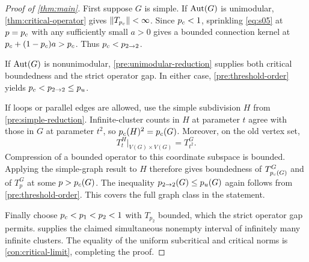 \begin{proof}[Proof of \cref{thm:main}]
First suppose $G$ is simple. If $\operatorname{Aut}(G)$ is unimodular,
\cref{thm:critical-operator} gives $\lVert T_{{p_c}}\rVert<\infty$.
Since ${p_c}<1$, sprinkling \eqref{eq:s05} at $p={p_c}$ with any
sufficiently small $a>0$ gives a bounded connection kernel at
${p_c}+(1-{p_c})a>{p_c}$. Thus ${p_c}<{p_{2\to2}}$.

If $\operatorname{Aut}(G)$ is nonunimodular, \cref{pre:unimodular-reduction} supplies both
critical boundedness and the strict operator gap. In either case,
\cref{pre:threshold-order} yields ${p_c}<{p_{2\to2}}\le{p_u}$.

If loops or parallel edges are allowed, use the simple subdivision
$H$ from \cref{pre:simple-reduction}. Infinite-cluster counts in $H$
at parameter $t$ agree with those in $G$ at parameter $t^2$, so
${p_c}(H)^2={p_c}(G)$. Moreover, on the old vertex set,
\[
 T^H_t\big|_{V(G)\times V(G)}=T^G_{t^2}.
\]
Compression of a bounded operator to this coordinate subspace is
bounded. Applying the simple-graph result to $H$ therefore gives
boundedness of $T^G_{{p_c}(G)}$ and of $T^G_p$ at some $p>{p_c}(G)$.
The inequality ${p_{2\to2}}(G)\le{p_u}(G)$ again follows from
\cref{pre:threshold-order}. This covers the full graph class in the
statement.

Finally choose ${p_c}<p_1<p_2<1$ with $T_{p_2}$ bounded, which the strict
operator gap permits.  supplies
the claimed simultaneous nonempty interval of infinitely many
infinite clusters. The equality of the uniform subcritical and critical
norms is \cref{con:critical-limit}, completing the proof.
\end{proof}
